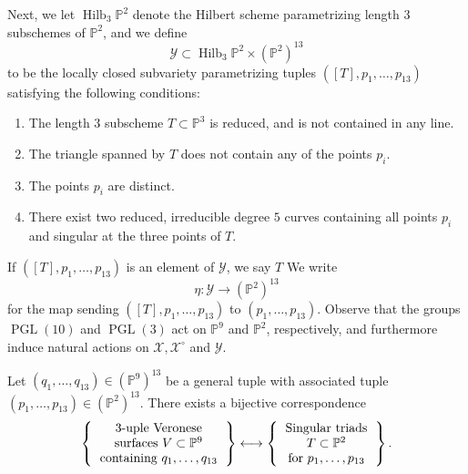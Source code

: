 \documentclass{article}
\renewcommand{\P}{\mathbb{P}}
\DeclareMathOperator{\PGL}{PGL}
\DeclareMathOperator{\Hilb}{Hilb}
\begin{document}
Next, we let $\Hilb_{3}\P^{2}$ denote the Hilbert scheme parametrizing length $3$ subschemes of $\P^{2}$, and we define  $$\mathcal{Y} \subset \Hilb_{3}\P^{2} \times (\P^{2})^{13}$$ to be the locally closed subvariety parametrizing tuples $\left([T], p_1, \dots, p_{13}\right)$ satisfying the following conditions: 

\begin{enumerate}
    \item The length $3$ subscheme $T \subset \P^{3}$ is reduced, and is not contained in any line.
    \item The triangle spanned by $T$ does not contain any of the points $p_{i}$.
    \item The points $p_{i}$ are distinct.
    \item There exist two reduced, irreducible degree $5$ curves containing all points $p_{i}$ and singular at the three points of $T$.
\end{enumerate}

If $\left([T], p_{1}, \dots, p_{13} \right)$ is an element of $\mathcal{Y}$, we say $T$ 
We write $$\eta: \mathcal{Y} \to (\P^{2})^{13}$$ for the map sending $([T],p_{1}, \dots, p_{13})$ to $(p_{1}, \dots, p_{13})$.  Observe that the groups $\PGL(10)$ and $\PGL(3)$ act on $\P^{9}$ and $\P^{2}$, respectively, and furthermore induce natural actions on $\mathcal{X}, \mathcal{X}^{\circ}$ and $\mathcal{Y}$. 

\begin{theorem}
\label{theorem:translation}
Let $(q_{1}, \dots, q_{13}) \in (\P^{9})^{13}$ be a general tuple with associated tuple $(p_{1}, \dots, p_{13}) \in (\P^{2})^{13}.$  There exists a bijective correspondence 
\begin{align*}
    \left\{ \begin{tabular}{c}
         $3$-uple Veronese\\ surfaces $V \subset \P^{9}$ \\
         containing $q_{1}, \dots , q_{13}$
    \end{tabular}\right\} \longleftrightarrow \left\{ \begin{tabular}{c}
         Singular triads \\ $T \subset \P^{2}$ \\
         for $p_{1}, \dots, p_{13}$
    \end{tabular} \right\}.
\end{align*}
\end{theorem}
\end{document}
